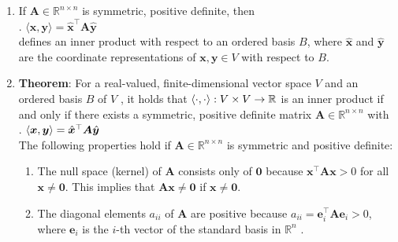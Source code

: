 \begin{enumerate}
    \item If $\bm{A} \in \mathbb{R}^{n\times n}$ is symmetric, positive definite, then
    \hfill \cite{mfml/book/mml/Deisenroth-Faisal-Ong}
    \\
    .\hfill
    $⟨\bm{x}, \bm{y}⟩ = \hat{\bm{x}}^\top \bm{A} \hat{\bm{y}}$
    \hfill \cite{mfml/book/mml/Deisenroth-Faisal-Ong}
    \\
    defines an inner product with respect to an ordered basis $B$, where $\hat{\bm{x}}$ and $\hat{\bm{y}}$ are the coordinate representations of $\bm{x}, \bm{y} \in V$ with respect to $B$.
    \hfill \cite{mfml/book/mml/Deisenroth-Faisal-Ong}

    \item \textbf{Theorem}: For a real-valued, finite-dimensional vector space $V$ and an ordered basis $B$ of $V$ , it holds that $\langle\cdot, \cdot\rangle : V \times V \to \mathbb{R}$ is an inner product if and only if there exists a symmetric, positive definite matrix $\bm{A} \in \mathbb{R}^{n\times n}$ with
    \hfill \cite{mfml/book/mml/Deisenroth-Faisal-Ong}
    \\
    .\hfill
    $\langle\bm{x}, \bm{y}\rangle = \hat{\bm{x}} ^\top \bm{A} \hat{\bm{y}}$
    \hfill \cite{mfml/book/mml/Deisenroth-Faisal-Ong}
    \\
    The following properties hold if $\bm{A} \in \mathbb{R}^{n\times n}$ is symmetric and positive definite:
    \hfill \cite{mfml/book/mml/Deisenroth-Faisal-Ong}
    \begin{enumerate}
        \item The null space (kernel) of $\bm{A}$ consists only of $\bm{0}$ because $\bm{x} ^\top \bm{Ax} > 0$ for all $\bm{x} \neq \bm{0}$. 
        This implies that $\bm{Ax} \neq \bm{0}$ if $\bm{x} \neq \bm{0}$.
        \hfill \cite{mfml/book/mml/Deisenroth-Faisal-Ong}

        \item The diagonal elements $a_{ii}$ of $\bm{A}$ are positive because $a_{ii} = \bm{e}^\top _i \bm{A} \bm{e}_i > 0$, where $\bm{e}_i$ is the $i$-th vector of the standard basis in $\mathbb{R}^n$ .
        \hfill \cite{mfml/book/mml/Deisenroth-Faisal-Ong}
    \end{enumerate}
\end{enumerate}















